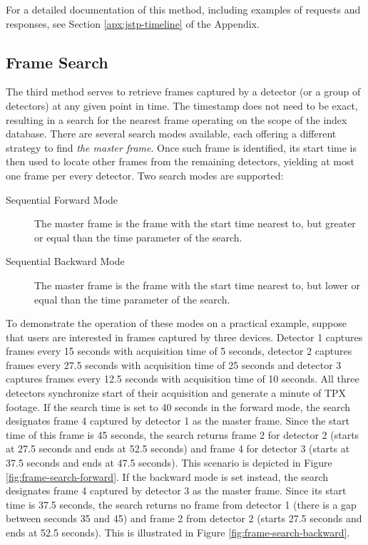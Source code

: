 For a detailed documentation of this method, including examples of requests and responses, see Section \ref{apx:jstp-timeline} of the Appendix.

\subsection{Frame Search}
The third method serves to retrieve frames captured by a detector (or a group of detectors) at any given point in time. The timestamp does not need to be exact, resulting in a search for the nearest frame operating on the scope of the index database. There are several search modes available, each offering a different strategy to find \textit{the master frame}. Once such frame is identified, its start time is then used to locate other frames from the remaining detectors, yielding at most one frame per every detector. Two search modes are supported:

\begin{description}
	\item[Sequential Forward Mode]
	The master frame is the frame with the start time nearest to, but greater or equal than the time parameter of the search.

	\item[Sequential Backward Mode]
	The master frame is the frame with the start time nearest to, but lower or equal than the time parameter of the search.
\end{description}



To demonstrate the operation of these modes on a practical example, suppose that users are interested in frames captured by three devices. Detector 1 captures frames every 15 seconds with acquisition time of 5 seconds, detector 2 captures frames every 27.5 seconds with acquisition time of 25 seconds and detector 3 captures frames every 12.5 seconds with acquisition time of 10 seconds. All three detectors synchronize start of their acquisition and generate a minute of TPX footage. If the search time is set to 40 seconds in the forward mode, the search designates frame 4 captured by detector 1 as the master frame. Since the start time of this frame is 45 seconds, the search returns frame 2 for detector 2 (starts at 27.5 seconds and ends at 52.5 seconds) and frame 4 for detector 3 (starts at 37.5 seconds and ends at 47.5 seconds). This scenario is depicted in Figure \ref{fig:frame-search-forward}. If the backward mode is set instead, the search designates frame 4 captured by detector 3 as the master frame. Since its start time is 37.5 seconds, the search returns no frame from detector 1 (there is a gap between seconds 35 and 45) and frame 2 from detector 2 (starts 27.5 seconds and ends at 52.5 seconds). This is illustrated in Figure \ref{fig:frame-search-backward}.

